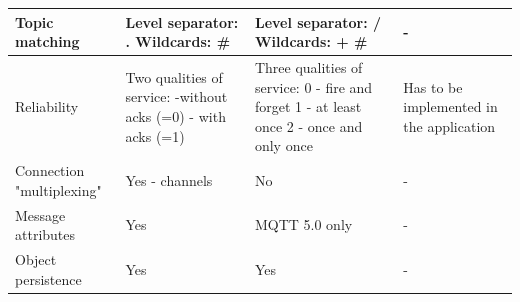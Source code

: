 \begin{table}
\begin{center}
\begin{tabular}{|p{3cm}|p{4.5cm}|p{4.5cm}|p{4.5cm}|}
    \hline
    Topic matching & Level separator: . Wildcards: \* \# & Level separator: / Wildcards: + \# & - \\
    \hline
    Reliability & Two qualities of service: -without acks (=0) - with acks (=1) & Three qualities of service: 0 - fire and forget 1 - at least once 2 - once and only once & Has to be implemented in the application\\
    \hline
    Connection "multiplexing" & Yes - channels & No & -\\
    \hline
    Message attributes & Yes & MQTT 5.0 only & -\\
    \hline
    Object persistence & Yes & Yes & -\\
    \hline
    \end{tabular}
    \label{tab-1}
    \end{center}
    \end{table}